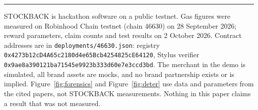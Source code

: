 \documentclass[10.5pt,letterpaper]{article}
\theoremstyle{definition}
\theoremstyle{remark}
\newcommand{\ttt}[1]{\texttt{#1}}
\begin{document}
\vspace{6pt}
\noindent\rule{\textwidth}{0.4pt}
\footnotesize
\noindent STOCKBACK is hackathon software on a public testnet. Gas figures were measured on Robinhood Chain testnet (chain 46630) on
28 September 2026; reward parameters, claim counts and test results on 2 October 2026. Contract addresses are in
\ttt{deployments/46630.json}: registry \ttt{0x4273b12cD4A65c2180d4e65Bcb4254825cE64120}, Stylus verifier
\ttt{0x9ae8a390121ba71545e9923b333d60e7e3ccd3bd}. The merchant in the demo is simulated, all brand assets are mocks, and
no brand partnership exists or is implied. Figure~\ref{fig:forensics} and Figure~\ref{fig:deter} use data and parameters from the cited
papers, not STOCKBACK measurements. Nothing in this paper claims a result that was not measured.
\end{document}
